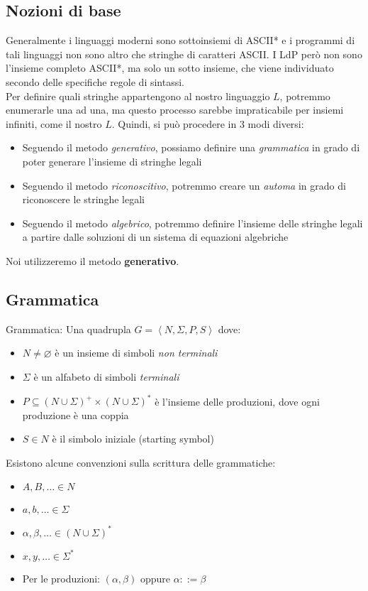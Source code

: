 \documentclass{article}
\begin{document}
\subsection{Nozioni di base}
Generalmente i linguaggi moderni sono sottoinsiemi di ASCII* e i programmi di tali linguaggi non sono altro che stringhe di caratteri ASCII. I LdP però non sono l'insieme completo ASCII*, ma solo un sotto insieme, che viene individuato secondo delle specifiche regole di sintassi.\\
Per definire quali stringhe appartengono al nostro linguaggio \(L\), potremmo enumerarle una ad una, ma questo processo sarebbe impraticabile per insiemi infiniti, come il nostro \(L\). Quindi, si può procedere in 3 modi diversi:
\begin{itemize}
    \item Seguendo il metodo \emph{generativo}, possiamo definire una \emph{grammatica} in grado di poter generare l'insieme di stringhe legali
    \item Seguendo il metodo \emph{riconoscitivo}, potremmo creare un \emph{automa} in grado di riconoscere le stringhe legali
    \item Seguendo il metodo \emph{algebrico}, potremmo definire l'insieme delle stringhe legali a partire dalle soluzioni di un sistema di equazioni algebriche
\end{itemize}
Noi utilizzeremo il metodo \textbf{generativo}.

\subsection{Grammatica}
\begin{dfn}{Grammatica: }
    Una quadrupla \( G = \left\langle N, \Sigma, P, S \right\rangle\) dove:
    \begin{itemize}
        \item \( N \neq \varnothing \) è un insieme di simboli \emph{non terminali}
        \item \( \Sigma \) è un alfabeto di simboli \emph{terminali}
        \item \( P \subseteq (N \cup \Sigma)^+ \times (N \cup \Sigma)^* \) è l'insieme delle produzioni, dove ogni produzione è una coppia
        \item \( S \in N \) è il simbolo iniziale (starting symbol)
    \end{itemize}
\end{dfn}

\noindent Esistono alcune convenzioni sulla scrittura delle grammatiche:
\begin{itemize}
    \item \(A, B, \ldots \in N\)
    \item \(a, b, \ldots \in \Sigma\)
    \item \(\alpha, \beta, \ldots \in (N \cup \Sigma)^*\)
    \item \(x, y, \ldots \in \Sigma^*\)
    \item Per le produzioni: \((\alpha, \beta) \text{ oppure } \alpha ::= \beta\)
\end{itemize}
\end{document}
